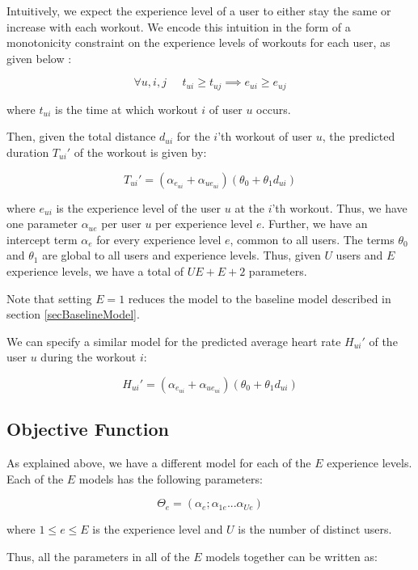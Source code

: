 \documentclass{acm_proc_article-sp}
\begin{document}
Intuitively, we expect the experience level of a user to either stay the same or increase with each workout. We encode this intuition in the form of a monotonicity constraint on the experience levels of workouts for each user, as given below \cite{www13}:

$$\forall u,i,j \;\;\;\;\; t_{ui} \geq t_{uj} \implies e_{ui} \geq e_{uj}$$

where $t_{ui}$ is the time at which workout $i$ of user $u$ occurs.

Then, given the total distance $d_{ui}$ for the $i$'th workout of user $u$, the predicted duration $T_{ui}'$ of the workout is given by:

\begin{equation}
\label{eqnModelDuration}
T_{ui}' = (\alpha_{e_{ui}} + \alpha_{ue_{ui}})(\theta_0 + \theta_1 d_{ui})
\end{equation}


where $e_{ui}$ is the experience level of the user $u$ at the $i$'th workout. Thus, we have one parameter $\alpha_{ue}$ per user $u$ per experience level $e$. Further, we have an intercept term $\alpha_e$ for every experience level $e$, common to all users. The terms $\theta_0$ and $\theta_1$ are global to all users and experience levels. Thus, given $U$ users and $E$ experience levels, we have a total of $UE + E + 2$ parameters.

Note that setting $E = 1$ reduces the model to the baseline model described in section \ref{secBaselineModel}.

We can specify a similar model for the predicted average heart rate $H_{ui}'$ of the user $u$ during the workout $i$:

\begin{equation}
\label{eqnModelAvgHr}
H_{ui}' = (\alpha_{e_{ui}} + \alpha_{ue_{ui}})(\theta_0 + \theta_1 d_{ui})
\end{equation}

\subsection{Objective Function}
As explained above, we have a different model for each of the $E$ experience levels. Each of the $E$ models has the following parameters:

$$\Theta_e = (\alpha_e; \alpha_{1e}...\alpha_{Ue})$$

where $1 \leq e \leq E$ is the experience level and $U$ is the number of distinct users.

Thus, all the parameters in all of the $E$ models together can be written as:
\end{document}

